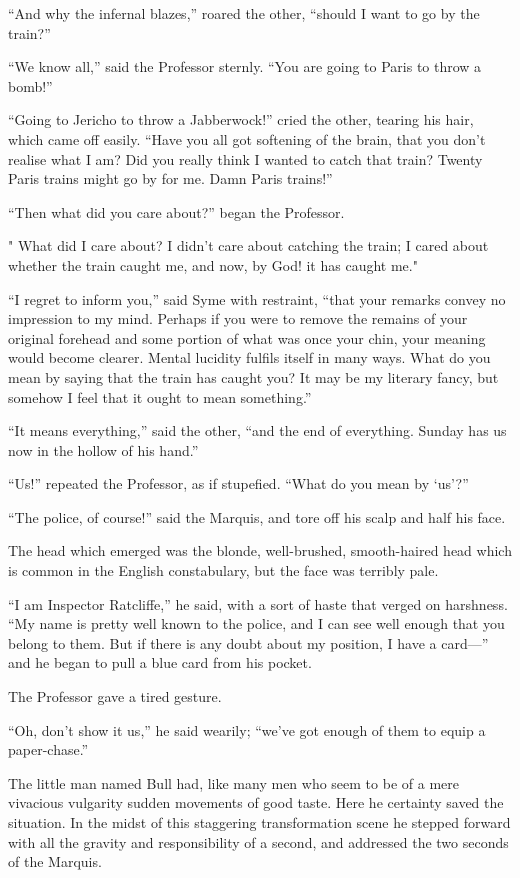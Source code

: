 \documentclass{book}
\begin{document}
“And why the infernal blazes,” roared the other, “should I want to go by the train?”

“We know all,” said the Professor sternly. “You are going to Paris to throw a bomb!”

“Going to Jericho to throw a Jabberwock!” cried the other, tearing his hair, which came off easily. “Have you all got softening of the brain, that you don’t realise what I am? Did you really think I wanted to catch that train? Twenty Paris trains might go by for me. Damn Paris trains!”

“Then what did you care about?” began the Professor.

" What did I care about? I didn’t care about catching the train; I cared about whether the train caught me, and now, by God! it has caught me."

“I regret to inform you,” said Syme with restraint, “that your remarks convey no impression to my mind. Perhaps if you were to remove the remains of your original forehead and some portion of what was once your chin, your meaning would become clearer. Mental lucidity fulfils itself in many ways. What do you mean by saying that the train has caught you? It may be my literary fancy, but somehow I feel that it ought to mean something.”

“It means everything,” said the other, “and the end of everything. Sunday has us now in the hollow of his hand.”

“Us!” repeated the Professor, as if stupefied. “What do you mean by ‘us’?”

“The police, of course!” said the Marquis, and tore off his scalp and half his face.

The head which emerged was the blonde, well-brushed, smooth-haired head which is common in the English constabulary, but the face was terribly pale.

“I am Inspector Ratcliffe,” he said, with a sort of haste that verged on harshness. “My name is pretty well known to the police, and I can see well enough that you belong to them. But if there is any doubt about my position, I have a card—” and he began to pull a blue card from his pocket.

The Professor gave a tired gesture.

“Oh, don’t show it us,” he said wearily; “we’ve got enough of them to equip a paper-chase.”

The little man named Bull had, like many men who seem to be of a mere vivacious vulgarity sudden movements of good taste. Here he certainty saved the situation. In the midst of this staggering transformation scene he stepped forward with all the gravity and responsibility of a second, and addressed the two seconds of the Marquis.
\end{document}

